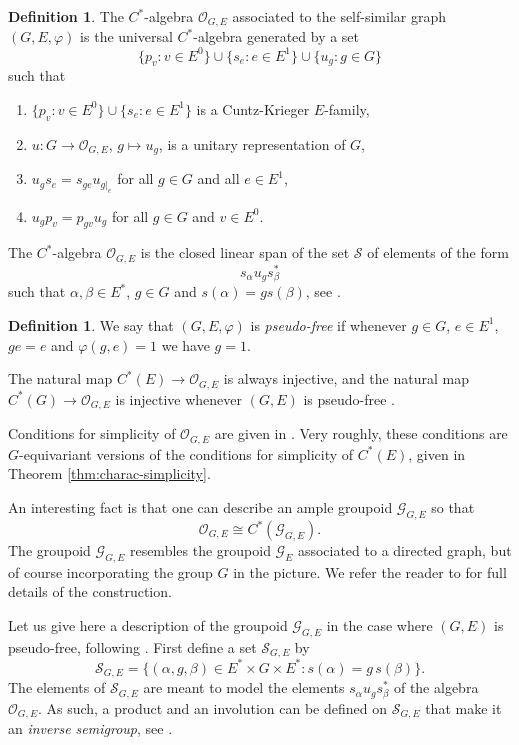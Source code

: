 \documentclass[11pt]{amsart}
\theoremstyle{plain}            %
\theoremstyle{definition}       %
\newtheorem{definition}[theorem]{Definition}
\theoremstyle{definition}       %
\theoremstyle{remark}
\begin{document}
\begin{definition}
	The $C^*$-algebra $\mathcal  O _{G,E}$ associated to the 
	self-similar graph $(G,E,\varphi)$ is  the universal $C^*$-algebra generated by a set   
	$$\{ p_v : v\in E^0 \}\cup \{ s_e : e\in E^1\} \cup \{ u_g : g\in G\}$$
	such that
	\begin{enumerate}
		\item $\{ p_v : v\in E^0 \}\cup \{ s_e : e\in E^1\}$ is a Cuntz-Krieger $E$-family,
		\item $u\colon G\to \mathcal O _{G,E}$, $g\mapsto u_g$, is a unitary representation of $G$,
		\item $u_gs_e = s_{ge} u_{g|_e}$ for all $g\in G$ and all $e\in E^1$,
		\item $ u_gp_v = p_{gv} u_g$ for all $g\in G$ and $v\in E^0$. 
	\end{enumerate} 
\end{definition}

The $C^*$-algebra $\mathcal O_{G,E}$ is the closed linear span of the set $\mathcal S$ of elements of the form
$$s_\alpha u_g s_\beta^* $$
such that $\alpha,\beta \in E^*$, $g\in G$ and $s(\alpha) = gs(\beta)$, see \cite[Proposition 3.9]{ep17}.

\begin{definition}
	\label{def:pseudo-free}
	We say that $(G,E,\varphi)$ is {\it pseudo-free} if whenever $g\in G$, $e\in E^1$, $ge= e$ and $\varphi (g,e)= 1$ we have $g=1$.  
\end{definition}


The natural map $C^*(E)\to \mathcal O _{G,E}$ is always injective, and the natural map $C^*(G)\to \mathcal O _{G,E}$ is injective whenever $(G,E)$ is pseudo-free \cite[Propositions 11.1 and  11.8]{ep17}.


Conditions for simplicity of $\mathcal O _{G,E}$ are given in \cite[Theorem 16.1]{ep17}. Very roughly, these conditions are $G$-equivariant versions of the conditions for simplicity of $C^*(E)$, given in  Theorem \ref{thm:charac-simplicity}.

An interesting fact is that one can describe an ample groupoid $\mathcal G_{G,E}$ so that
$$\mathcal O _{G,E}\cong C^*(\mathcal G_{G,E}).$$
The groupoid $\mathcal G_{G,E}$ resembles the groupoid $\mathcal G_E$ associated to a directed graph, but of course incorporating the group $G$ in the picture. We refer the reader to \cite{ep17} for full details of the construction.  

Let us give here a description of the groupoid $\mathcal G_{G,E}$ in the case where $(G,E)$ is pseudo-free, following \cite[Proposition 8.6]{ep17}. First define a set $\mathcal S_{G,E}$ by
$$\mathcal S_{G,E} = \{ (\alpha, g ,\beta) \in E^*\times G\times E^* : s(\alpha)= g \, s(\beta)\}.$$
The elements of $\mathcal S_{G,E}$ are meant to model the elements $s_{\alpha}u_gs_{\beta}^*$ of the algebra $\mathcal O_{G,E}$. As such, a product and an involution can be defined on $\mathcal S_{G,E}$ that make it an {\it inverse semigroup}, see \cite{ep17}.
\end{document}
